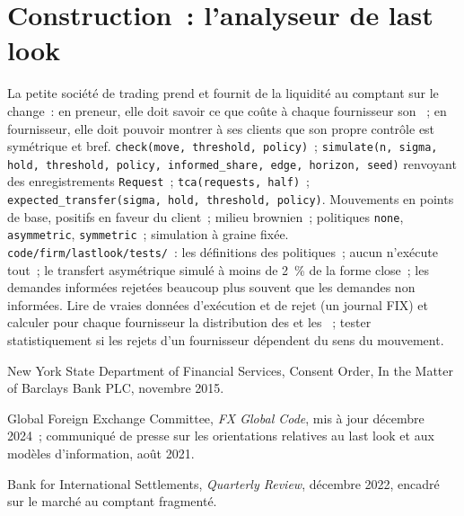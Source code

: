 \section{Construction~: l'analyseur de last look}\label{bld:m2:fx-spot-microstructure:lastlook}

\begin{build}
 La petite société de trading prend et fournit de la liquidité au comptant sur le change~:
en preneur, elle doit savoir ce que coûte à chaque fournisseur son ~; en fournisseur,
elle doit pouvoir montrer à ses clients que son propre contrôle est symétrique et bref.
 \texttt{check(move, threshold, policy)}~; \texttt{simulate(n, sigma, hold, threshold, policy, informed\_share, edge,
horizon, seed)} renvoyant des enregistrements \texttt{Request}~; \texttt{tca(requests,
half)}~; \texttt{expected\_transfer(sigma, hold, threshold, policy)}.
 Mouvements en points de base, positifs en faveur du client~;
milieu brownien~; politiques \texttt{none}, \texttt{asymmetric}, \texttt{symmetric}~;
simulation à graine fixée.
 \texttt{code/firm/lastlook/tests/}~: les définitions des
politiques~; aucun  n'exécute tout~; le transfert asymétrique simulé à moins de
2~\% de la forme close~; les demandes informées rejetées beaucoup plus souvent que les
demandes non informées.
 Lire de vraies données d'exécution et de rejet (un journal FIX) et calculer
pour chaque fournisseur la distribution des  et les ~; tester statistiquement si les
rejets d'un fournisseur dépendent du sens du mouvement.
\end{build}

\begin{omsources}
\item New York State Department of Financial Services, Consent Order, In the Matter of Barclays Bank PLC, novembre 2015.
\item Global Foreign Exchange Committee, \emph{FX Global Code}, mis à jour
décembre 2024~; communiqué de presse sur les orientations relatives au last look et aux modèles d'information,
août 2021.
\item Bank for International Settlements, \emph{Quarterly Review}, décembre
2022, encadré sur le marché au comptant fragmenté.
\end{omsources}

